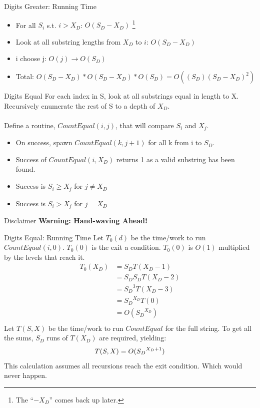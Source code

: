 \documentclass[10pt]{beamer}
\begin{document}
\begin{frame}{Digits Greater: Running Time}
  \large
  \begin{itemize} %
    \item For all $S_{i}$ s.t. $i > X_{D}$: $O(S_D - X_D)$ \footnote{The ``$- X_D$'' comes back up later.}
    \item Look at all substring lengths from $X_D$ to $i$: $O(S_D - X_D)$
    \item i choose j: $O(j) \rightarrow O(S_D)$
    \item Total: $O(S_D - X_D)*O(S_D - X_D)*O(S_D) = O((S_{D})(S_{D} - X_D)^{2})$
  \end{itemize}
\end{frame}

\begin{frame}{Digits Equal}
  \large
  For each index in S, look at all substrings equal in length to X.
  Recursively enumerate the rest of S to a depth of $X_{D}$. \\ \\
  Define a routine, $CountEqual(i,j)$, that will compare $S_{i}$ and $X_{j}$.
  \begin{itemize}
    \item On success, spawn $CountEqual(k, j + 1)$ for all k from i to $S_{D}$.
    \item Success of $CountEqual(i, X_{D})$ returns 1 as a valid substring has been found.
    \item Success is $S_{i} \ge X_{j}$ for $j \ne X_{D}$
    \item Success is $S_{i} > X_{j}$ for $j = X_{D}$
  \end{itemize}
\end{frame}

\begin{frame}{Disclaimer}
  \Huge \textbf{Warning: Hand-waving Ahead!}
\end{frame}

\begin{frame}{Digits Equal: Running Time}
  Let $T_{0}(d)$ be the time/work to run $CountEqual(i, 0)$.
  $T_{0}(0)$ is the exit a condition.
  $T_{0}(0)$ is $O(1)$ multiplied by the levels that reach it. \\
  \begin{align*}
    T_{0}(X_{D}) &= S_{D}T(X_{D} - 1) \\
         &= S_{D}S_{D}T(X_{D} - 2) \\
         &= {S_{D}}^{3}T(X_{D} - 3) \\
         &= {S_{D}}^{X_{D}}T(0) \\
         &= O({S_{D}}^{X_{D}}) \\
  \end{align*}
  Let $T(S, X)$ be the time/work to run $CountEqual$ for the full string.
  To get all the sums, $S_{D}$ runs of $T(X_{D})$ are required, yielding:
  \begin{equation*}
    T(S, X) = O({S_{D}}^{X_{D} + 1}) \\
  \end{equation*}
  This calculation assumes all recursions reach the exit condition.
  Which would never happen.
\end{frame}
\end{document}
